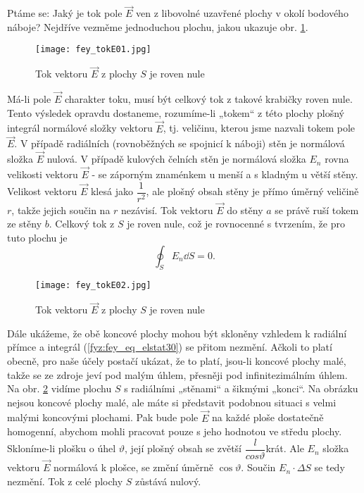     Ptáme se: Jaký je tok pole \(\vec{E}\) ven z libovolné uzavřené plochy v okolí bodového náboje? 
    Nejdříve vezměme jednoduchou plochu, jakou ukazuje obr. \ref{fyz:fig_fey_tokE01}. 
    
    \begin{figure}[ht!]
      \centering
      \texttt{[image: fey\_tokE01.jpg]}
      \caption{Tok vektoru \(\vec{E}\) z plochy \(S\) je roven nule}
     \label{fyz:fig_fey_tokE01} 
    \end{figure}
    
    Má-li pole \(\vec{E}\) charakter toku, musí být celkový tok z takové krabičky roven nule. Tento 
    výsledek opravdu dostaneme, rozumíme-li „tokem“ z této plochy plošný integrál normálové složky 
    vektoru \(\vec{E}\), tj. veličinu, kterou jsme nazvali tokem pole \(\vec{E}\). V případě 
    radiálních (rovnoběžných se spojnicí k náboji) stěn je normálová složka \(\vec{E}\) nulová. V 
    případě kulových čelních stěn je normálová složka \(E_n\) rovna velikosti vektoru \(\vec{E}\) - 
    se záporným znaménkem u menší a s kladným u větší stěny. Velikost vektoru \(\vec{E}\) klesá jako 
    \(\dfrac{1}{r^2}\), ale plošný obsah stěny je přímo úměrný veličině \(r\), takže jejich součin 
    na \(r\) nezávisí. Tok vektoru \(\vec{E}\) do stěny \(a\) se právě ruší tokem ze stěny \(b\). 
    Celkový tok z \(S\) je roven nule, což je rovnocenné s tvrzením, že pro tuto plochu je
    \begin{equation}\label{fyz:fey_eq_elstat30}
    \oint_SE_n\dd{S} = 0.
    \end{equation}
    
    \begin{figure}[ht!]
      \texttt{[image: fey\_tokE02.jpg]}
      \caption{Tok vektoru \(\vec{E}\) z plochy \(S\) je roven nule}
     \label{fyz:fig_fey_tokE02} 
    \end{figure}

    Dále ukážeme, že obě koncové plochy mohou být skloněny vzhledem k radiální přímce a integrál 
    (\ref{fyz:fey_eq_elstat30}) se přitom nezmění. Ačkoli to platí obecně, pro naše účely postačí 
    ukázat, že to platí, jsou-li koncové plochy malé, takže se ze zdroje jeví pod malým úhlem, 
    přesněji pod infinitezimálním úhlem. Na obr. \ref{fyz:fig_fey_tokE02} vidíme plochu \(S\) s 
    radiálními „stěnami“ a šikmými „konci“. Na obrázku nejsou koncové plochy malé, ale máte si 
    představit podobnou situaci s velmi malými koncovými plochami. Pak bude pole \(\vec{E}\) na 
    každé ploše dostatečně homogenní, abychom mohli pracovat pouze s jeho hodnotou ve středu plochy. 
    Skloníme-li plošku o úhel \(\vartheta\), její plošný obsah se zvětší 
    \(\dfrac{l}{cos\vartheta}\)krát. Ale \(E_n\) složka vektoru \(\vec{E}\) normálová k plošce, se 
    změní úměrně \(\cos\vartheta\). Součin \(E_n\cdot\Delta S\) se tedy nezmění. Tok z celé plochy 
    \(S\) zůstává nulový.
      
